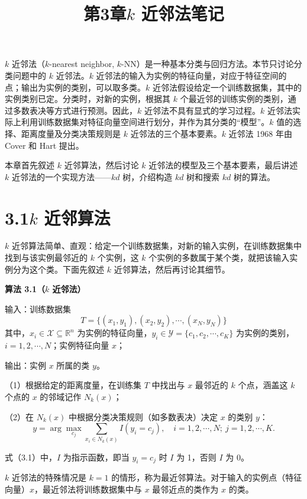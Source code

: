 \documentclass[UTF8,12pt,a4paper,fontset=fandol]{ctexart}
\title{第3章\quad $k$ 近邻法笔记}
\author{}
\date{}
\begin{document}
\maketitle

$k$ 近邻法（$k$-nearest neighbor, $k$-NN）是一种基本分类与回归方法。本节只讨论分类问题中的 $k$ 近邻法。$k$ 近邻法的输入为实例的特征向量，对应于特征空间的点；输出为实例的类别，可以取多类。$k$ 近邻法假设给定一个训练数据集，其中的实例类别已定。分类时，对新的实例，根据其 $k$ 个最近邻的训练实例的类别，通过多数表决等方式进行预测。因此，$k$ 近邻法不具有显式的学习过程。$k$ 近邻法实际上利用训练数据集对特征向量空间进行划分，并作为其分类的“模型”。$k$ 值的选择、距离度量及分类决策规则是 $k$ 近邻法的三个基本要素。$k$ 近邻法 1968 年由 Cover 和 Hart 提出。

本章首先叙述 $k$ 近邻算法，然后讨论 $k$ 近邻法的模型及三个基本要素，最后讲述 $k$ 近邻法的一个实现方法——$kd$ 树，介绍构造 $kd$ 树和搜索 $kd$ 树的算法。

\section*{3.1\quad $k$ 近邻算法}

$k$ 近邻算法简单、直观：给定一个训练数据集，对新的输入实例，在训练数据集中找到与该实例最邻近的 $k$ 个实例，这 $k$ 个实例的多数属于某个类，就把该输入实例分为这个类。下面先叙述 $k$ 近邻算法，然后再讨论其细节。

\noindent\textbf{算法 3.1（$k$ 近邻法）}

\noindent 输入：训练数据集
\[
T=\{(x_1,y_1),(x_2,y_2),\cdots,(x_N,y_N)\}
\]
其中，$x_i\in\mathcal{X}\subseteq \mathbb{R}^n$ 为实例的特征向量，$y_i\in\mathcal{Y}=\{c_1,c_2,\cdots,c_K\}$ 为实例的类别，$i=1,2,\cdots,N$；实例特征向量 $x$；

\noindent 输出：实例 $x$ 所属的类 $y$。

（1）根据给定的距离度量，在训练集 $T$ 中找出与 $x$ 最邻近的 $k$ 个点，涵盖这 $k$ 个点的 $x$ 的邻域记作 $N_k(x)$；

（2）在 $N_k(x)$ 中根据分类决策规则（如多数表决）决定 $x$ 的类别 $y$：
\begin{equation}
y=\arg\max_{c_j}\sum_{x_i\in N_k(x)} I(y_i=c_j),\quad i=1,2,\cdots,N;\ j=1,2,\cdots,K.
\tag{3.1}
\end{equation}

式（3.1）中，$I$ 为指示函数，即当 $y_i=c_j$ 时 $I$ 为 1，否则 $I$ 为 0。

$k$ 近邻法的特殊情况是 $k=1$ 的情形，称为最近邻算法。对于输入的实例点（特征向量）$x$，最近邻法将训练数据集中与 $x$ 最邻近点的类作为 $x$ 的类。
\end{document}
